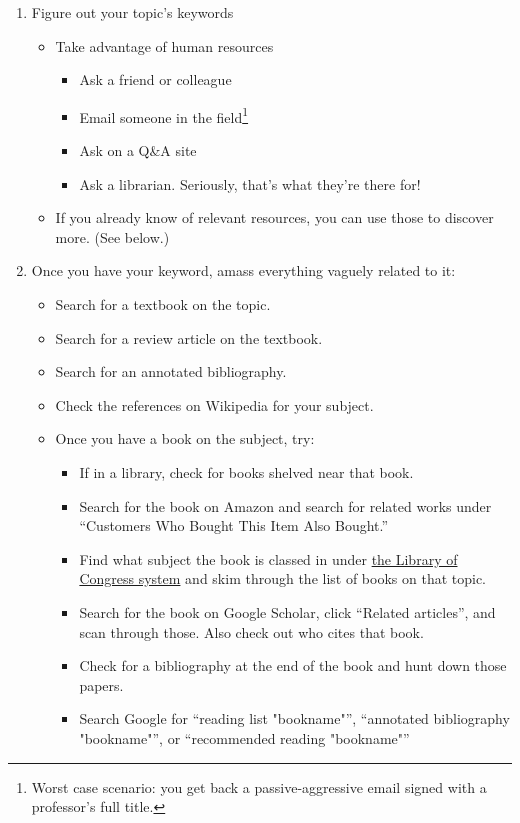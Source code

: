 \begin{enumerate}
\item Figure out your topic's keywords
  \begin{itemize}
  \item Take advantage of human resources
    \begin{itemize}
    \item Ask a friend or colleague
    \item Email someone in the field\footnote{Worst case scenario: you get back a passive-aggressive email signed with a professor's full title.}
    \item Ask on a Q\&A site
    \item Ask a librarian. Seriously, that's what they're there for!
    \end{itemize}
  \item If you already know of relevant resources, you can use those to discover
    more. (See below.)
  \end{itemize}
\item Once you have your keyword, amass everything vaguely related to it:
  \begin{itemize}
    \item Search for a textbook on the topic.
    \item Search for a review article on the textbook.
    \item Search for an annotated bibliography.
    \item Check the references on Wikipedia for your subject.
  \item Once you have a book on the subject, try:
    \begin{itemize}
    \item If in a library, check for books shelved near that book.
    \item Search for the book on Amazon and search for related works under ``Customers Who Bought This Item Also Bought.''
    \item Find what subject the book is classed in under \href{http://catalog.loc.gov/}{the Library of Congress system} and skim through the list of books on that topic.
    \item Search for the book on Google Scholar, click ``Related articles'', and scan through those. Also check out who cites that book.
    \item Check for a bibliography at the end of the book and hunt down those papers.
    \item Search Google for ``reading list "bookname"'', ``annotated bibliography "bookname"'', or ``recommended reading "bookname"''

\end{itemize}
\end{itemize}
\end{enumerate}
